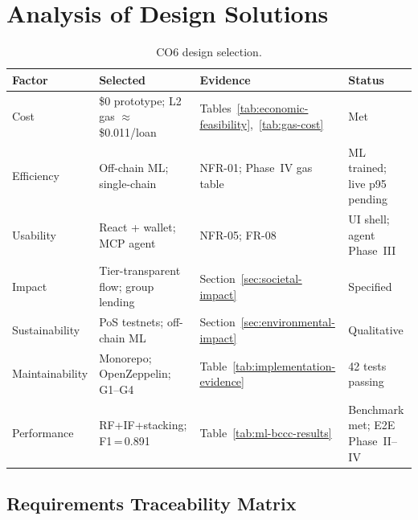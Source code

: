 \documentclass[12pt,a4paper]{report}
\newcommand{\tableheadcolor}{\rowcolor{TableHeadBg}}
\begin{document}
\section{Analysis of Design Solutions}
\label{sec:analysis-design-solutions}

\begin{table}[H]
\centering
\caption[CO6 design selection]{CO6 design selection.}
\label{tab:co6-selection-summary}
\small
\begin{tabular}{@{}p{2.2cm}p{3.6cm}p{4.0cm}p{4.4cm}@{}}
\toprule
\tableheadcolor
\textbf{Factor} & \textbf{Selected} & \textbf{Evidence} & \textbf{Status} \\
\midrule
Cost & \$0 prototype; L2 gas ${\approx}$\$0.011/loan & Tables~\ref{tab:economic-feasibility},~\ref{tab:gas-cost} & Met \\
Efficiency & Off-chain ML; single-chain & NFR-01; Phase~IV gas table & ML trained; live p95 pending \\
Usability & React + wallet; MCP agent & NFR-05; FR-08 & UI shell; agent Phase~III \\
Impact & Tier-transparent flow; group lending & Section~\ref{sec:societal-impact} & Specified \\
Sustainability & PoS testnets; off-chain ML & Section~\ref{sec:environmental-impact} & Qualitative \\
Maintainability & Monorepo; OpenZeppelin; G1--G4 & Table~\ref{tab:implementation-evidence} & 42 tests passing \\
Performance & RF+IF+stacking; F1\,=\,0.891 & Table~\ref{tab:ml-bccc-results} & Benchmark met; E2E Phase~II--IV \\
\bottomrule
\end{tabular}
\end{table}

\subsection{Requirements Traceability Matrix}
\label{sec:traceability}
\end{document}
